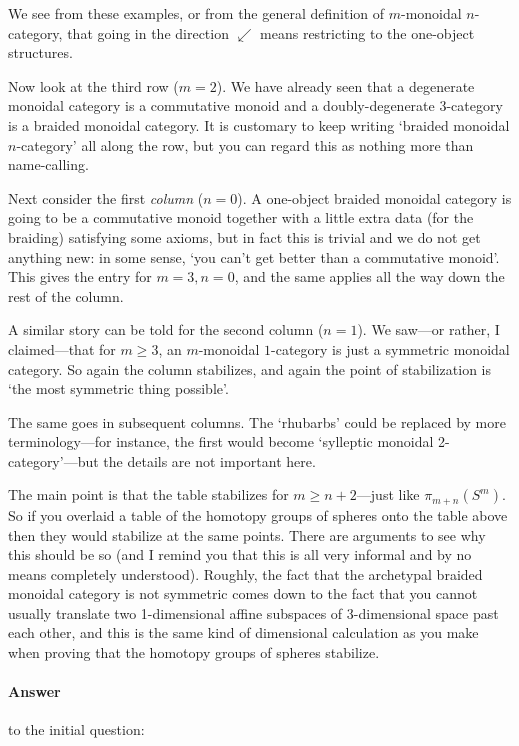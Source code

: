 We see from these examples, or from the general definition of $m$-monoidal
$n$-category, that going in the direction $\swarrow$ means restricting to
the one-object structures.

Now look at the third row ($m=2$).  We have already seen that a degenerate
monoidal category is a commutative monoid and a doubly-degenerate
3-category is a braided monoidal category.  It is customary to keep writing
`braided monoidal $n$-category' all along the row, but you can regard this
as nothing more than name-calling.

Next consider the first \emph{column} ($n=0$).  A one-object braided%
%
%
monoidal category is going to be a commutative monoid together with a
little extra data (for the braiding) satisfying some axioms, but in fact
this is trivial and we do not get anything new: in some sense, `you can't
get better than a commutative monoid'.  This gives the entry for $m=3,
n=0$, and the same applies all the way down the rest of the column.

A similar story can be told for the second column ($n=1$).  We saw---or
rather, I claimed---that for $m\geq 3$, an $m$-monoidal $1$-category is
just a symmetric monoidal category.  So again the column stabilizes, and
again the point of stabilization is `the most symmetric thing possible'.

The same goes in subsequent columns.  The `rhubarbs' could be replaced by
more terminology---for instance, the first would become `sylleptic%
%
%
monoidal
2-category'---but the details are not important here.

The main point is that the table stabilizes for $m\geq n+2$---just like
$\pi_{m+n}(S^m)$.  So if you overlaid a table of the homotopy groups%
%
%
of
spheres onto the table above then they would stabilize at the same points.
There are arguments to see why this should be so (and I remind you that
this is all very informal and by no means completely understood).  Roughly,
the fact that the archetypal braided monoidal category  is not
symmetric comes down to the fact that you cannot usually translate two
1-dimensional affine subspaces of 3-dimensional space past each other, and
this is the same kind of dimensional calculation as you make when proving
that the homotopy groups of spheres stabilize.%
%
%

\paragraph{Answer} to the initial question:

